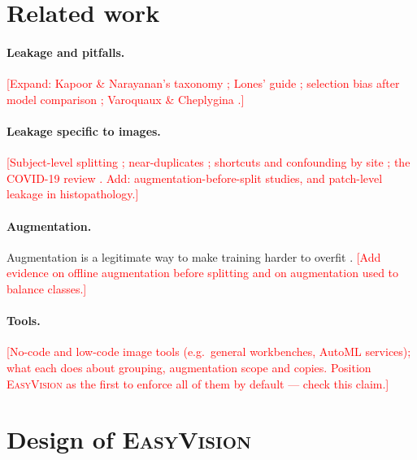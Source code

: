 \documentclass[11pt,a4paper]{article}
\newcommand{\EV}{\textsc{EasyVision}}
\newcommand{\TBD}[1]{\textcolor{red}{[#1]}}
\begin{document}
\section{Related work}
\label{sec:related}

\paragraph{Leakage and pitfalls.} \TBD{Expand: Kapoor \& Narayanan's taxonomy \citep{kapoor2023leakage}; Lones' guide \citep{lones2021pitfalls}; selection bias after model comparison \citep{varma2006bias,cawley2010overfitting}; Varoquaux \& Cheplygina \citep{varoquaux2022failures}.}

\paragraph{Leakage specific to images.} \TBD{Subject-level splitting \citep{yagis2021leakage}; near-duplicates \citep{barz2020cifar}; shortcuts and confounding by site \citep{zech2018pneumonia,geirhos2020shortcut,degrave2021shortcuts}; the COVID-19 review \citep{roberts2021covid}. Add: augmentation-before-split studies, and patch-level leakage in histopathology.}

\paragraph{Augmentation.} Augmentation is a legitimate way to make training harder to overfit \citep{shorten2019augmentation}. \TBD{Add evidence on offline augmentation before splitting and on augmentation used to balance classes.}

\paragraph{Tools.} \TBD{No-code and low-code image tools (e.g.\ general workbenches, AutoML services); what each does about grouping, augmentation scope and copies. Position \EV{} as the first to enforce all of them by default --- check this claim.}

\section{Design of \EV}
\label{sec:design}
\end{document}
